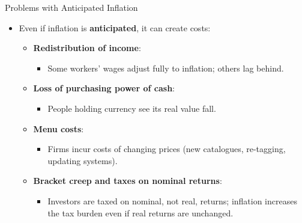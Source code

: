 \documentclass[aspectratio=169]{beamer}
\begin{document}
\begin{frame}{Problems with Anticipated Inflation}
\transfade
\begin{itemize}
  \item Even if inflation is \textbf{anticipated}, it can create costs:
  \begin{itemize}
    \item \textbf{Redistribution of income}:
    \begin{itemize}
      \item Some workers’ wages adjust fully to inflation; others lag behind.
    \end{itemize}
    \item \textbf{Loss of purchasing power of cash}:
    \begin{itemize}
      \item People holding currency see its real value fall.
    \end{itemize}
    \item \textbf{Menu costs}:
    \begin{itemize}
      \item Firms incur costs of changing prices (new catalogues, re-tagging, updating systems).
    \end{itemize}
    \item \textbf{Bracket creep and taxes on nominal returns}:
    \begin{itemize}
      \item Investors are taxed on nominal, not real, returns; inflation increases the tax burden even if real returns are unchanged.
    \end{itemize}
  \end{itemize}
\end{itemize}
\end{frame}
\end{document}
